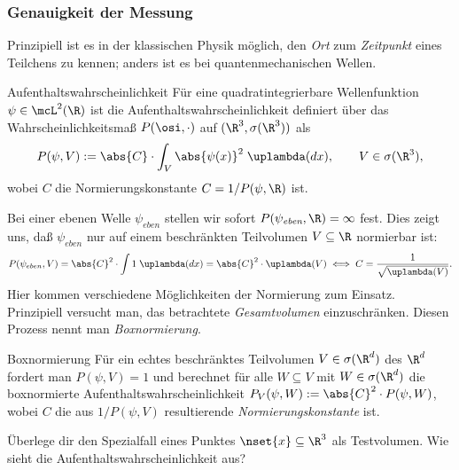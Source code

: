 \documentclass{article}
\begin{document}
        \subsubsection*{Genauigkeit der Messung}
        \noindent Prinzipiell ist es in der klassischen Physik möglich, den \emph{Ort} zum \emph{Zeitpunkt} eines Teilchens zu kennen; anders ist es bei quantenmechanischen Wellen. 
        \begin{mdef}{Aufenthaltswahrscheinlichkeit}
            Für eine quadratintegrierbare Wellenfunktion $\psi\in\mcL^2(\R)$ ist die Aufenthaltswahrscheinlichkeit definiert über das Wahrscheinlichkeitsmaß $P(\osi,\cdot)$ auf $(\R^3,\sigma(\R^3))$ als 
            \[
                P(\psi,V) := \abs{C}\cdot\int_V\abs{\psi(x)}^2\;\uplambda(dx),\qquad V\in\sigma(\R^3),
            \]
            wobei $C$ die Normierungskonstante $C = 1/P(\psi,\R)$ ist.
        \end{mdef}
        Bei einer ebenen Welle $\psi_\textit{eben}$ stellen wir sofort $P(\psi_\textit{eben},\R) = \infty$ fest. Dies zeigt uns, daß $\psi_\textit{eben}$ nur auf einem beschränkten Teilvolumen $V\subseteq\R$ normierbar ist:
        \[
            P(\psi_{eben},V) = \abs{C}^2\cdot\int 1\;\uplambda(dx) = \abs{C}^2\cdot\uplambda(V) \iff C = \frac{1}{\sqrt{\uplambda(V)}}. 
        \] 
        Hier kommen verschiedene Möglichkeiten der Normierung zum Einsatz. Prinzipiell versucht man, das betrachtete \emph{Gesamtvolumen} einzuschränken. Diesen Prozess nennt man \emph{Boxnormierung}.
        \begin{mdef}{Boxnormierung}
            Für ein echtes beschränktes Teilvolumen $V\in\sigma(\R^d)$ des $\R^d$ fordert man $P(\psi,V) = 1$ und berechnet für alle $W\subseteq V$ mit $W\in\sigma(\R^d)$ die boxnormierte Aufenthaltswahrscheinlichkeit $P_V(\psi,W) := \abs{C}^2\cdot P(\psi,W)$, wobei $C$ die aus $1/P(\psi,V)$ resultierende \emph{Normierungskonstante} ist.
        \end{mdef} 
        
        \begin{Aufgabe}
            \nr{} Überlege dir den Spezialfall eines Punktes $\nset{x}\subseteq\R^3$ als Testvolumen. Wie sieht die Aufenthaltswahrscheinlichkeit aus?
        \end{Aufgabe}
\end{document}
